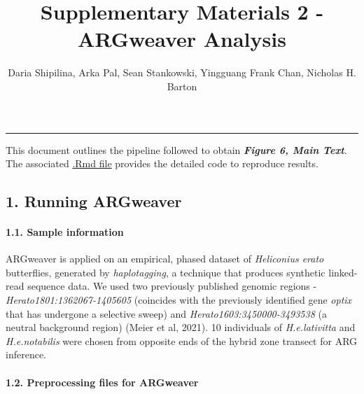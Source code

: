 \documentclass[
]{article}
\title{Supplementary Materials 2 - ARGweaver Analysis}
\author{Daria Shipilina, Arka Pal, Sean Stankowski, Yingguang Frank
Chan, Nicholas H. Barton}
\date{}
\begin{document}
\maketitle

\begin{center}\rule{0.5\linewidth}{0.5pt}\end{center}

\hfill\break
\setcounter{table}{0} \renewcommand{\thetable}{S\arabic{table}} \setcounter{figure}{0} \renewcommand{\thefigure}{S\arabic{figure}}

This document outlines the pipeline followed to obtain
\textbf{\emph{Figure 6, Main Text}}. The associated
\href{https://github.com/DaSh-bash/Suppl_Materials_On_the_origin_2022}{.Rmd
file} provides the detailed code to reproduce results.

\hypertarget{running-argweaver}{%
\subsection{1. Running ARGweaver}\label{running-argweaver}}

\hypertarget{sample-information}{%
\paragraph{\texorpdfstring{1.1. Sample information\\
}{1.1. Sample information }}\label{sample-information}}

\hfill\break
ARGweaver is applied on an empirical, phased dataset of \emph{Heliconius
erato} butterflies, generated by \emph{haplotagging}, a technique that
produces synthetic linked-read sequence data. We used two previously
published genomic regions - \emph{Herato1801:1362067-1405605} (coincides
with the previously identified gene \emph{optix} that has undergone a
selective sweep) and \emph{Herato1603:3450000-3493538} (a neutral
background region) (Meier et al, 2021). 10 individuals of
\emph{H.e.lativitta} and \emph{H.e.notabilis} were chosen from opposite
ends of the hybrid zone transect for ARG inference.

\hypertarget{preprocessing-files-for-argweaver}{%
\paragraph{\texorpdfstring{1.2. Preprocessing files for ARGweaver\\
}{1.2. Preprocessing files for ARGweaver }}\label{preprocessing-files-for-argweaver}}
\end{document}
